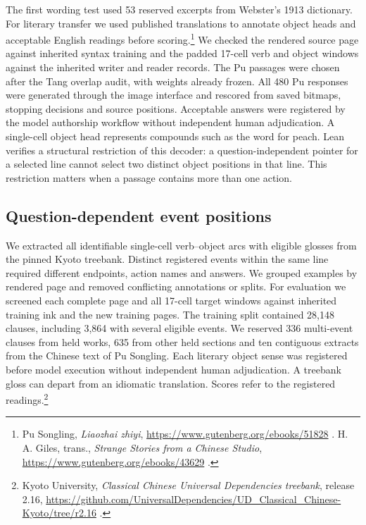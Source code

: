 \documentclass[12pt,a4paper]{article}
\providecommand{\DIFadd}[1]{{\protect\color{blue} \sf #1}} %
\begin{document}
\DIFadd{The first wording test used 53 reserved excerpts from Webster's 1913 dictionary. For literary transfer we used published translations to annotate object heads and acceptable English readings before scoring.}\footnote{\DIFadd{Pu Songling, \textit{Liaozhai zhiyi}, }\url{https://www.gutenberg.org/ebooks/51828}\DIFadd{. H. A. Giles, trans., \textit{Strange Stories from a Chinese Studio}, }\url{https://www.gutenberg.org/ebooks/43629}\DIFadd{.}} \DIFadd{We checked the rendered source page against inherited syntax training and the padded 17-cell verb and object windows against the inherited writer and reader records. The Pu passages were chosen after the Tang overlap audit, with weights already frozen. All 480 Pu responses were generated through the image interface and rescored from saved bitmaps, stopping decisions and source positions. Acceptable answers were registered by the model authorship workflow without independent human adjudication. A single-cell object head represents compounds such as the word for peach. Lean verifies a structural restriction of this decoder: a question-independent pointer for a selected line cannot select two distinct object positions in that line. This restriction matters when a passage contains more than one action.
}

\subsection*{\DIFadd{Question-dependent event positions}}
\DIFadd{We extracted all identifiable single-cell verb--object arcs with eligible glosses from the pinned Kyoto treebank. Distinct registered events within the same line required different endpoints, action names and answers. We grouped examples by rendered page and removed conflicting annotations or splits. For evaluation we screened each complete page and all 17-cell target windows against inherited training ink and the new training pages. The training split contained 28,148 clauses, including 3,864 with several eligible events. We reserved 336 multi-event clauses from held works, 635 from other held sections and ten contiguous extracts from the Chinese text of Pu Songling. Each literary object sense was registered before model execution without independent human adjudication. A treebank gloss can depart from an idiomatic translation. Scores refer to the registered readings.}\footnote{\DIFadd{Kyoto University, \textit{Classical Chinese Universal Dependencies treebank}, release 2.16, }\url{https://github.com/UniversalDependencies/UD_Classical_Chinese-Kyoto/tree/r2.16}\DIFadd{.}}
\end{document}
